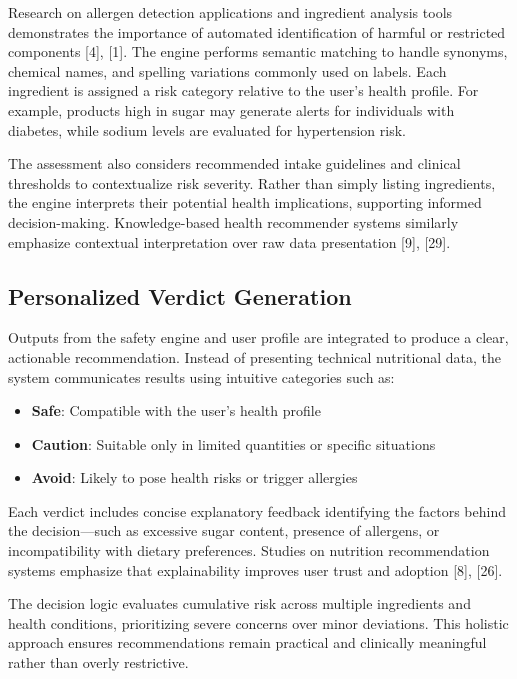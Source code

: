 \documentclass[conference]{IEEEtran}
\begin{document}
Research on allergen detection applications and ingredient analysis tools demonstrates the importance of automated identification of harmful or restricted components [4], [1]. The engine performs semantic matching to handle synonyms, chemical names, and spelling variations commonly used on labels. Each ingredient is assigned a risk category relative to the user’s health profile. For example, products high in sugar may generate alerts for individuals with diabetes, while sodium levels are evaluated for hypertension risk.

The assessment also considers recommended intake guidelines and clinical thresholds to contextualize risk severity. Rather than simply listing ingredients, the engine interprets their potential health implications, supporting informed decision-making. Knowledge-based health recommender systems similarly emphasize contextual interpretation over raw data presentation [9], [29].

\subsection{Personalized Verdict Generation}

Outputs from the safety engine and user profile are integrated to produce a clear, actionable recommendation. Instead of presenting technical nutritional data, the system communicates results using intuitive categories such as:

\begin{itemize}
    \item \textbf{Safe}: Compatible with the user’s health profile
    \item \textbf{Caution}: Suitable only in limited quantities or specific situations
    \item \textbf{Avoid}: Likely to pose health risks or trigger allergies
\end{itemize}

Each verdict includes concise explanatory feedback identifying the factors behind the decision—such as excessive sugar content, presence of allergens, or incompatibility with dietary preferences. Studies on nutrition recommendation systems emphasize that explainability improves user trust and adoption [8], [26].

The decision logic evaluates cumulative risk across multiple ingredients and health conditions, prioritizing severe concerns over minor deviations. This holistic approach ensures recommendations remain practical and clinically meaningful rather than overly restrictive.
\end{document}
